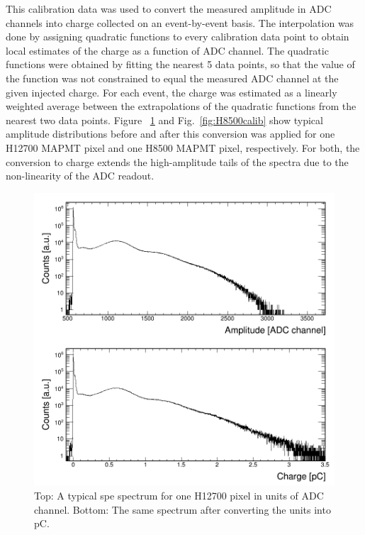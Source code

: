 This calibration data was used to convert the measured amplitude in ADC channels into charge collected on an event-by-event basis. The interpolation was done by assigning quadratic functions to every calibration data point to obtain local estimates of the charge as a function of ADC channel. The quadratic functions were obtained by fitting the nearest 5 data points, so that the value of the function was not constrained to equal the measured ADC channel at the given injected charge. For each event, the charge was estimated as a linearly weighted average between the extrapolations of the quadratic functions from the nearest two data points. Figure ~\ref{fig:H12700calib} and Fig.~\ref{fig:H8500calib} show typical amplitude distributions before and after this conversion was applied for one H12700 MAPMT pixel and one H8500 MAPMT pixel, respectively. For both, the conversion to charge extends the high-amplitude tails of the spectra due to the non-linearity of the ADC readout.

\begin{figure}[hbt!]
	\centering
	\includegraphics[width=\linewidth]{figures/GA0982_w1_g064_v1100_063_adc_charge.png}
	\caption{Top: A typical spe spectrum for one H12700 pixel in units of ADC channel. Bottom: The same spectrum after converting the units into pC.}
	\label{fig:H12700calib}
\end{figure}

